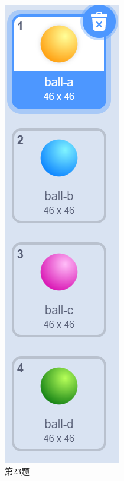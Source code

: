 \documentclass[10pt, a4paper]{article}
\begin{document}
\begin{enumerate}
\begin{figure}[htbp]
\begin{minipage}[t]{.25\textwidth}
                \begin{minipage}[t]{.25\textwidth}
                    \centering
                    \includegraphics[width=\textwidth]{23-2.png}
                \end{minipage}
                \caption*{第23题}
            \end{minipage}
        \end{figure}


\end{enumerate}
\end{document}
